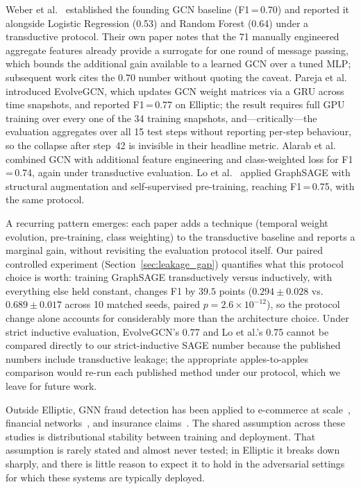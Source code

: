 Weber et al.~\citep{weber2019} established the founding GCN
baseline (F1\,=\,0.70) and reported it alongside Logistic Regression
(0.53) and Random Forest (0.64) under a transductive protocol.
Their own paper notes that the 71 manually engineered aggregate
features already provide a surrogate for one round of message
passing, which bounds the additional gain available to a learned
GCN over a tuned MLP; subsequent work cites the 0.70 number without
quoting the caveat.  Pareja et al.~\citep{pareja2020evolvegcn}
introduced EvolveGCN, which updates GCN weight matrices via a GRU
across time snapshots, and reported F1\,=\,0.77 on Elliptic; the
result requires full GPU training over every one of the 34 training
snapshots, and---critically---the evaluation aggregates over all
15 test steps without reporting per-step behaviour, so the collapse
after step~42 is invisible in their headline metric.  Alarab et
al.~\citep{alarab2020} combined GCN with additional feature
engineering and class-weighted loss for F1\,=\,0.74, again under
transductive evaluation.  Lo et al.~\citep{lo2023} applied
GraphSAGE with structural augmentation and self-supervised
pre-training, reaching F1\,=\,0.75, with the same protocol.

A recurring pattern emerges: each paper adds a technique (temporal
weight evolution, pre-training, class weighting) to the transductive
baseline and reports a marginal gain, without revisiting the
evaluation protocol itself.  Our paired controlled experiment
(Section~\ref{sec:leakage_gap}) quantifies what this protocol choice
is worth: training GraphSAGE transductively versus inductively,
with everything else held constant, changes F1 by $39.5$ points
($0.294 \pm 0.028$ vs.\ $0.689 \pm 0.017$ across 10 matched seeds,
paired $p = 2.6 \times 10^{-12}$), so the protocol change alone
accounts for considerably
more than the architecture choice.  Under strict inductive
evaluation, EvolveGCN's 0.77 and Lo et al.'s 0.75 cannot be
compared directly to our strict-inductive SAGE number because the published
numbers include transductive leakage; the appropriate apples-to-apples
comparison would re-run each published method under our protocol,
which we leave for future work.

Outside Elliptic, GNN fraud detection has been applied to e-commerce
at scale~\citep{wang2019semi}, financial networks~\citep{liu2018geniepath},
and insurance claims~\citep{pourhabibi2020fraud}.  The shared
assumption across these studies is distributional stability between
training and deployment.  That assumption is rarely stated and almost
never tested; in Elliptic it breaks down sharply, and there is little
reason to expect it to hold in the adversarial settings for which these
systems are typically deployed.

